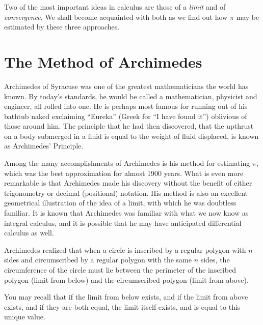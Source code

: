 \documentclass[11pt,a4paper,onecolumn]{article}
\begin{document}
Two of the most important ideas in calculus are those of a \emph{limit}
and of \emph{convergence}.  We shall become acquainted with both as we
find out how $\pi$ may be estimated by these three approaches.

\section{The Method of Archimedes}\label{sec:archi}

Archimedes of Syracuse was one of the greatest mathematicians the world
has known.  By today's standards, he would be called a mathematician,
physicist and engineer, all rolled into one.  He is perhaps most famous
for running out of his bathtub naked exclaiming ``Eureka'' (Greek for
``I have found it'') oblivious of those around him.  The principle that
he had then discovered, that the upthrust on a body submerged in a
fluid is equal to the weight of fluid displaced, is known as
Archimedes' Principle.

Among the many accomplishments of Archimedes is his method for estimating $\pi$, which was the best approximation for almost 1900 years.  What is even more remarkable is that Archimedes made his discovery without the benefit of either  trigonometry or decimal (positional) notation.  His method is also an excellent geometrical illustration of the idea of a limit, with which he was doubtless familiar. It is known that Archimedes was familiar with what we now know as integral calculus, and it is possible that he may have anticipated differential calculus as well. 

Archimedes realized that when a circle is inscribed by a regular
polygon with $n$ sides and circumscribed by a regular polygon with the
same $n$ sides, the circumference of the circle must lie between the
perimeter of the inscribed polygon (limit from below) and the
circumscribed polygon (limit from above).

You may recall that if the limit from below exists, and if the limit
from above exists, and if they are both equal, the limit itself exists,
and is equal to this unique value.
\end{document}

